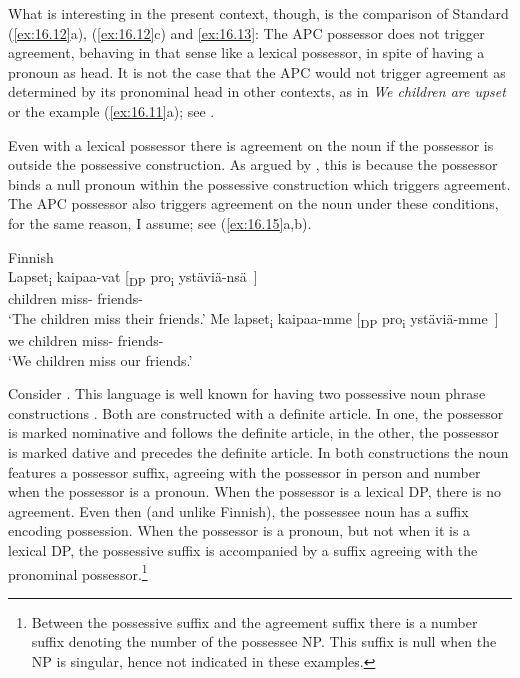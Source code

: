 \documentclass[output=paper]{langsci/langscibook}
\begin{document}
What is interesting in the present context, though, is the comparison of
Standard  (\ref{ex:16.12}a), (\ref{ex:16.12}c) and \eqref{ex:16.13}: The \gls{APC} possessor does not
trigger agreement, behaving in that sense like a lexical possessor, in spite of
having a pronoun as head. It is not the case that the \gls{APC} would not
trigger agreement as determined by its pronominal head in other contexts, as in
\emph{We children are upset} or the  example
(\ref{ex:16.11}a); see \citet{Hoehn2017}.

Even with a lexical possessor there is agreement on the noun if the possessor
is outside the possessive construction. As argued by
\citet{BratticoHuhmarniemi2015}, this is because the possessor binds a null
pronoun within the possessive construction which triggers agreement. The
\gls{APC} possessor also triggers agreement
on the noun under these conditions, for the same reason, I assume; see (\ref{ex:16.15}a,b).

\ea Finnish\\\label{ex:16.15}
	\ea
		\gll Lapset\textsubscript{i}  kaipaa-vat [\textsubscript{DP} pro\textsubscript{i} ystäviä-nsä~]\\
			children miss-\Tpl{} {} {} friends-\Tpl{}\\
		\glt    `The children miss their friends.'
	\ex
		\gll Me lapset\textsubscript{i}  kaipaa-mme [\textsubscript{DP} pro\textsubscript{i} ystäviä-mme~]\\
			we children miss-\Fpl{} {} {} friends-\Fpl{}\\
		\glt    `We children miss our friends.'
	\z
\z

Consider . This language is well known for having two possessive noun
phrase constructions \parencite{Szabolcsi1983,Szabolcsi1994}. Both are
constructed with a definite article. In one, the possessor is marked
nominative and follows the definite article, in the other,
the possessor is marked dative and precedes the definite article. In both
constructions the noun features a possessor suffix, agreeing with the possessor
in person and number when the possessor is a pronoun. When the possessor is a
lexical DP, there is no agreement. Even then (and unlike Finnish), the
possessee noun has a suffix encoding possession. When the possessor is a
pronoun, but not when it is a lexical DP, the possessive suffix is accompanied
by a suffix agreeing with the pronominal possessor.\footnote{Between the
possessive suffix and the agreement suffix there is a number suffix denoting
the number of the possessee NP. This suffix is null when the NP is singular,
hence not indicated in these examples.}
\end{document}
